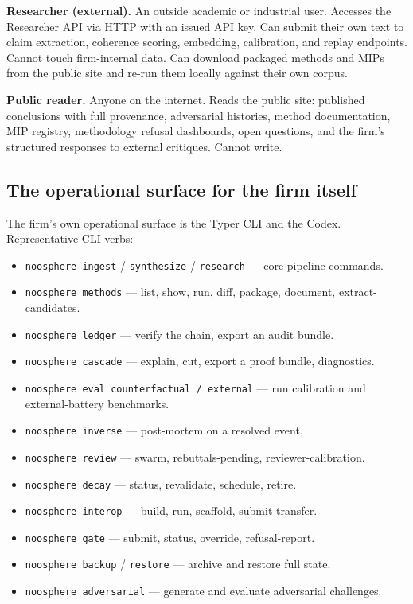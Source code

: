 \documentclass[11pt,letterpaper]{article}
\begin{document}
\textbf{Researcher (external).} An outside academic or industrial user. Accesses the Researcher API via HTTP with an issued API key. Can submit their own text to claim extraction, coherence scoring, embedding, calibration, and replay endpoints. Cannot touch firm-internal data. Can download packaged methods and MIPs from the public site and re-run them locally against their own corpus.

\textbf{Public reader.} Anyone on the internet. Reads the public site: published conclusions with full provenance, adversarial histories, method documentation, MIP registry, methodology refusal dashboards, open questions, and the firm's structured responses to external critiques. Cannot write.

\subsection{The operational surface for the firm itself}

The firm's own operational surface is the Typer CLI and the Codex. Representative CLI verbs:

\begin{itemize}[leftmargin=1.5em,itemsep=0.1em]
\item \texttt{noosphere ingest} / \texttt{synthesize} / \texttt{research} --- core pipeline commands.
\item \texttt{noosphere methods} --- list, show, run, diff, package, document, extract-candidates.
\item \texttt{noosphere ledger} --- verify the chain, export an audit bundle.
\item \texttt{noosphere cascade} --- explain, cut, export a proof bundle, diagnostics.
\item \texttt{noosphere eval counterfactual / external} --- run calibration and external-battery benchmarks.
\item \texttt{noosphere inverse} --- post-mortem on a resolved event.
\item \texttt{noosphere review} --- swarm, rebuttals-pending, reviewer-calibration.
\item \texttt{noosphere decay} --- status, revalidate, schedule, retire.
\item \texttt{noosphere interop} --- build, run, scaffold, submit-transfer.
\item \texttt{noosphere gate} --- submit, status, override, refusal-report.
\item \texttt{noosphere backup} / \texttt{restore} --- archive and restore full state.
\item \texttt{noosphere adversarial} --- generate and evaluate adversarial challenges.
\end{itemize}
\end{document}
